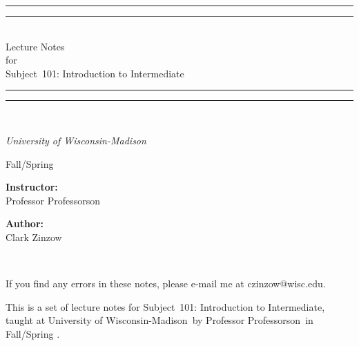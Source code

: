\documentclass[twoside, titlepage]{amsart}
\makeatletter
\newcommand{\authorName}{Clark Zinzow}  %
\newcommand{\subject}{Subject}  %
\newcommand{\courseNumber}{101}  %
\newcommand{\courseName}{Introduction to Intermediate}  %
\newcommand{\instName}{Professor Professorson}  %
\newcommand{\semester}{Fall/Spring \the\year}  %
\newcommand{\universityName}{University of Wisconsin-Madison}  %
\newcommand{\authorEmail}{czinzow@wisc.edu}  %
\theoremstyle{plain} %
\theoremstyle{definition}
\theoremstyle{remark}
\theoremstyle{notation}
\makeatother
\begin{document}
	
	\begin{titlepage}
		\centering
		\vspace*{\baselineskip}
		\rule{\textwidth}{1.6pt}\vspace*{-\baselineskip}\vspace*{2pt}
		\rule{\textwidth}{0.4pt}\\[\baselineskip]
		{\Huge Lecture Notes\\ for \\[0.4\baselineskip]
			\subject\ \courseNumber: \courseName
		}\\[0.2\baselineskip]
		\rule{\textwidth}{0.4pt}\vspace*{-\baselineskip}\vspace*{3pt}
		\rule{\textwidth}{1.6pt}\\[\baselineskip]
		\vspace*{3\baselineskip}
		\huge {\itshape \universityName \par}
		\vspace*{\baselineskip}
		\semester \par
		\vspace*{3\baselineskip}
		\begin{minipage}{0.4\textwidth}
			\begin{flushleft}
				\begin{center}
					\huge \textbf{Instructor:}  \\[\baselineskip]
					{ \instName}	
				\end{center}		
			\end{flushleft}
		\end{minipage}
		\begin{minipage}{0.4\textwidth}
			\begin{flushright}
				\begin{center}
					\huge \textbf{Author:} \\[\baselineskip]
					{ \authorName}
				\end{center}
			\end{flushright}
		\end{minipage}\\
		\vfill
		{ If you find any errors in these notes, please e-mail me at \authorEmail. \par}
	\end{titlepage}
	
	This is a set of lecture notes for \subject\ \courseNumber: \courseName, taught at \universityName\ by \instName\ in \semester.
	\hspace{0pt} \\
	
\end{document}
